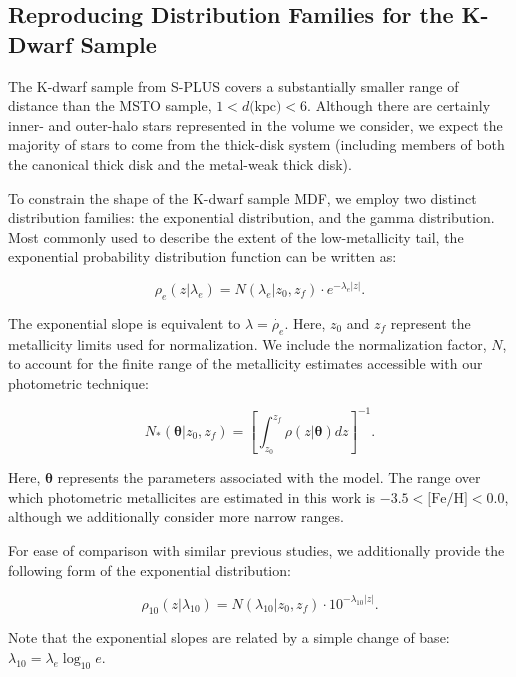 \documentclass[twocolumn,trackchanges]{aastex63}
\begin{document}
\subsection{Reproducing Distribution Families for the K-Dwarf Sample}

The K-dwarf sample from S-PLUS covers a substantially smaller range of distance than the MSTO sample, $1 < d \textrm{(kpc)} < 6$. Although there are certainly inner- and outer-halo stars represented in the volume we consider, we expect the majority of stars to come from the thick-disk system (including members of both the canonical thick disk and the metal-weak thick disk).

To constrain the shape of the K-dwarf sample MDF, we employ two distinct distribution families: the exponential distribution, and the gamma distribution. Most commonly used to describe the extent of the low-metallicity tail, the exponential probability distribution function can be written as:

\begin{equation}\label{eq:expo_e}
\rho_e(z | \lambda_e) = N(\lambda_e | z_0, z_f)\cdot e^{-\lambda_e |z|}.
\end{equation}

\noindent The exponential slope is equivalent to $\lambda = \dot{\rho_e}$. Here, $z_0$ and $z_f$ represent the metallicity limits used for normalization. We include the normalization factor, $N$, to account for the finite range of the metallicity estimates accessible with our photometric technique:

\begin{equation}
N_{*}(\boldsymbol{\theta} | z_0 , z_f) = \left[ \int_{z_0}^{z_f} \rho(z | \boldsymbol{\theta}) dz \right]^{-1}.
\end{equation}

\noindent Here, $\boldsymbol{\theta}$ represents the parameters associated with the model. The range over which photometric metallicites are estimated in this work is $-3.5 < \textrm{[Fe/H]} < 0.0$, although we additionally consider more narrow ranges.

For ease of comparison with similar previous studies, we additionally provide the following form of the exponential distribution:

\begin{equation}\label{eq:expo_10}
\rho_{10}(z | \lambda_{10}) = N(\lambda_{10} | z_0, z_f)\cdot 10^{-\lambda_{10} |z|}.
\end{equation}

\noindent Note that the exponential slopes are related by a simple change of base: $\lambda_{10} = \lambda_e \log_{10}{e}$.
\end{document}
